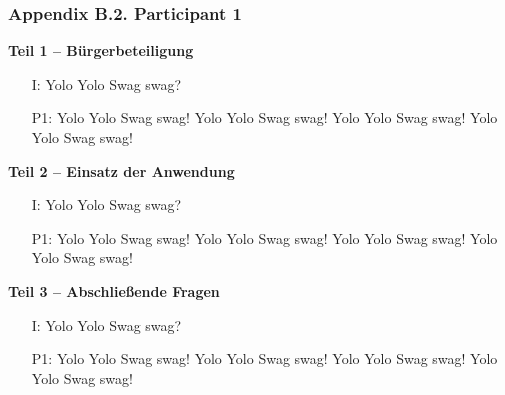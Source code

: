 \subsubsection{Appendix B.2. Participant 1}

\textbf{Teil 1 -- B{\"u}rgerbeteiligung}
\begin{itemize}
    \item[I:] Yolo Yolo Swag swag?
    \item[P1:] Yolo Yolo Swag swag! Yolo Yolo Swag swag! Yolo Yolo Swag swag! Yolo Yolo Swag swag!
\end{itemize}

\textbf{Teil 2 -- Einsatz der Anwendung}
\begin{itemize}
    \item[I:] Yolo Yolo Swag swag?
    \item[P1:] Yolo Yolo Swag swag! Yolo Yolo Swag swag! Yolo Yolo Swag swag! Yolo Yolo Swag swag!
\end{itemize}
\textbf{Teil 3 -- Abschlie{\ss}ende Fragen}
\begin{itemize}
    \item[I:] Yolo Yolo Swag swag?
    \item[P1:] Yolo Yolo Swag swag! Yolo Yolo Swag swag! Yolo Yolo Swag swag! Yolo Yolo Swag swag!
\end{itemize}
